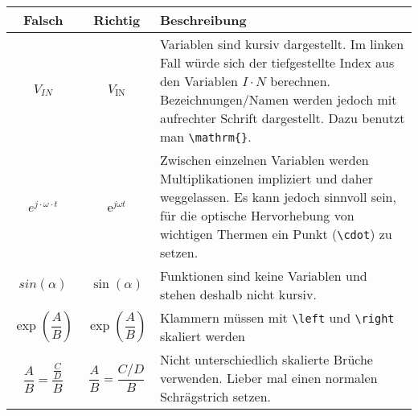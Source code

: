 {\def\arraystretch{2.0}
\begin{tabular}{c c p{10.0cm}}
\textbf{Falsch} & \textbf{Richtig} & \textbf{Beschreibung}\\ \hline
$V_{IN}$ & $V_{\mathrm{IN}}$ & Variablen sind kursiv dargestellt. Im linken Fall würde sich der tiefgestellte Index aus den Variablen $I \cdot N$ berechnen. Bezeichnungen/Namen  werden jedoch mit aufrechter Schrift dargestellt. Dazu benutzt man \verb|\mathrm{}|.\\

$e^{j \cdot \omega \cdot t}$ & $\mathrm{e}^{j\omega t}$ & Zwischen     einzelnen Variablen werden Multiplikationen impliziert und daher weggelassen. Es kann jedoch sinnvoll sein, für die optische Hervorhebung von wichtigen Thermen ein Punkt (\verb|\cdot|) zu setzen. \\

$sin(\alpha)$ & $\sin(\alpha)$ & Funktionen sind keine Variablen und stehen deshalb nicht kursiv.\\

$\exp(\dfrac{A}{B})$ & $\exp\left(\dfrac{A}{B}\right)$ & Klammern müssen mit \verb|\left| und \verb|\right| skaliert werden\\

$\dfrac{A}{B}=\dfrac{\frac{C}{D}}{B}$ & $\dfrac{A}{B}=\dfrac{C/D}{B}$  & Nicht unterschiedlich skalierte Brüche verwenden. Lieber mal einen normalen Schrägstrich setzen.
\end{tabular}\
}